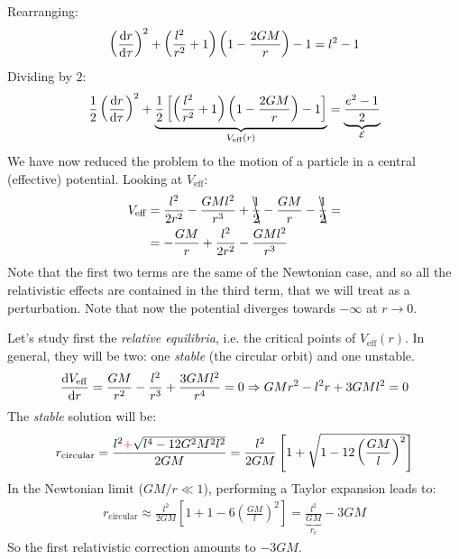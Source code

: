 \documentclass[../template.tex]{subfiles}
\begin{document}
Rearranging:
\begin{align*}
    \left(\dv{r}{\tau}\right)^{2} + \left(\frac{l^2}{r^2} + 1 \right)\left(1-\frac{2GM}{r} \right) - 1 = l^2 -1
\end{align*}
Dividing by $2$:
\begin{align*}
    \frac{1}{2}\left(\dv{r}{\tau}\right)^2 + \underbrace{\frac{1}{2} \left[\left(\frac{l^2}{r^2} + 1 \right)\left(1-\frac{2GM}{r} \right) - 1\right]}_{V_{\mathrm{eff} }(r)}  = \underbrace{\frac{e^2 - 1}{2}}_{\mathcal{E}}   
\end{align*} 
We have now reduced the problem to the motion of a particle in a central (effective) potential. Looking at $V_{\mathrm{eff} }$:
\begin{align*}
    V_{\mathrm{eff} } &= \frac{l^2}{2r^2} - \frac{GM l^2}{r^3} + \bcancel{\frac{1}{2}} - \frac{GM}{r} - \bcancel{\frac{1}{2}} = \\
    &= -\frac{GM}{r} + \frac{l^2}{2r^2} - \frac{GM l^2}{r^3}        
\end{align*}
Note that the first two terms are the same of the Newtonian case, and so all the relativistic effects are contained in the third term, that we will treat as a perturbation. Note that now the potential diverges towards $-\infty$  at $r \to 0$. 

Let's study first the \textit{relative equilibria}, i.e. the critical points of $V_{\mathrm{eff} }(r)$. In general, they will be two: one \textit{stable} (the circular  orbit) and one unstable. 
\begin{align*}
    \dv{V_{\mathrm{eff} }}{r} = \frac{GM}{r^2} - \frac{l^2}{r^3} + \frac{3 GM l^2}{r^4} = 0 \Rightarrow GM r^2 - l^2 r + 3 GM l^2 = 0   
\end{align*}   
The \textit{stable} solution will be:
\begin{align*}
    r_{\mathrm{circular} } = \frac{l^2 \textcolor{Red}{+} \sqrt{l^4 - 12 G^2 M^2 l^2}}{2 GM} =
    \frac{l^2}{2 GM}\left[1 + \sqrt{1-12 \left(\frac{GM}{l} \right)^2 }\right] 
\end{align*}  
In the Newtonian limit ($GM/r \ll 1$), performing a Taylor expansion leads to:
\begin{align*}
    r_{\mathrm{circular}} \approx \frac{l^2}{2 GM}\left[1 +1 - 6\left(\frac{GM}{l} \right)^2\right] = \underbrace{\frac{l^2}{GM}}_{r_c}  - 3GM 
\end{align*} 
So the first relativistic correction amounts to $-3GM$.
\end{document}
